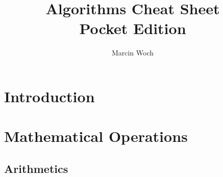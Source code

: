 \documentclass{article}
\author{Marcin Woch}
\title{Algorithms Cheat Sheet \\
\large Pocket Edition\\}
\date{}
\begin{document}
\maketitle

\newpage
\tableofcontents

\newpage
\section*{Introduction}


\newpage
\section*{Mathematical Operations}
\subsection*{Arithmetics}
\end{document}
